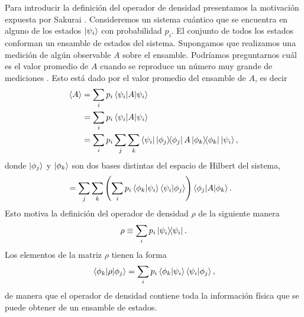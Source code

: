 Para introducir la definición del operador de densidad presentamos la 
motivación expuesta por Sakurai \cite{sakurai_napolitano_2017}.
Consideremos un sistema cuántico que se encuentra en alguno de los estados 
$\ket{\psi_{i} }$ con probabilidad $p_i$. El conjunto de todos los estados
conforman un ensamble de estados del sistema. Supongamos que realizamos 
una medición de algún observable $A$ sobre el ensamble. Podríamos 
preguntarnos cuál es el valor promedio de $A$ cuando se 
reproduce un número muy grande de mediciones \cite{sakurai_napolitano_2017}. 
Esto está dado por el valor promedio del ensamble de $A$, es decir
\begin{align}
	\expval{A} &= \sum_i p_i \matrixel{\psii}{A}{\psii} \\
	&= \sum_i p_i \matrixel{\psii}{A}{\psii} \\
	&= \sum_ip_i \sum _j\sum _k
	\bra{\psii}\dyad{\phi_j}{\phi_j}A\dyad{\phi_k}{\phi_k}\Pk{i},
\end{align}
donde $\ket{\phi_j}$ y $\ket{\phi_k}$ son dos bases distintas del
espacio de Hilbert del sistema,
\begin{align}
	&= \sum _j\sum _k \qty(\sum_ip_i \braket{\phi_k}{\psii}
	\braket{\psii}{\phi_j})	\matrixel{\phi_j}{A}{\phi_k}.
\end{align}
Esto motiva la definición del operador de densidad $\rho$ 
de la siguiente manera
\begin{equation}
	\rho \equiv \sum _i p_i\dyad{\psi_i}{\psi_i}.
	\label{eq:rho_def}
\end{equation}
Los elementos de la matriz $\rho$ tienen la forma 
\begin{align}
	\matrixel{\phi_k}{\rho}{\phi_j} = 
	\sum_ip_i \braket{\phi_k}{\psii}\braket{\psii}{\phi_j},
\end{align}
de manera que el operador de densidad contiene toda la información 
física que se puede obtener de un ensamble de estados.

